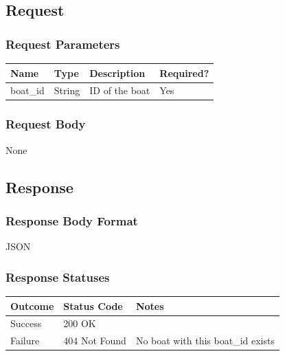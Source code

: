 \documentclass[letterpaper,11pt,titlepage,draftclsnofoot,onecolumn,compsoc,utf8,latin1]{IEEEtran}
\begin{document}
\begin{singlespace}
\subsection{Request}

\subsubsection{Request Parameters}

\begin{center}
    \begin{tabular}{ | p{} | p{} | p{} | p{} |}
    \hline
        \textbf{Name} & \textbf{Type} & \textbf{Description} &\textbf{Required?}  \\ \hline
        boat\_id & String & ID of the boat & Yes \\
    \hline
    \end{tabular}
\end{center}

\subsubsection{Request Body}

None

\subsection{Response}
\subsubsection{Response Body Format}

JSON

\subsubsection{Response Statuses}

\begin{center}
\begin{tabular}{ |p{}|p{}|p{}| } 
 \hline
 \textbf{Outcome} & \textbf{Status Code} & \textbf{Notes}  \\  \hline
 Success & 200 OK &  \\ \hline
 Failure & 404 Not Found & No boat with this boat\_id exists \\
 \hline
\end{tabular}
\end{center}


\end{singlespace}
\end{document}
